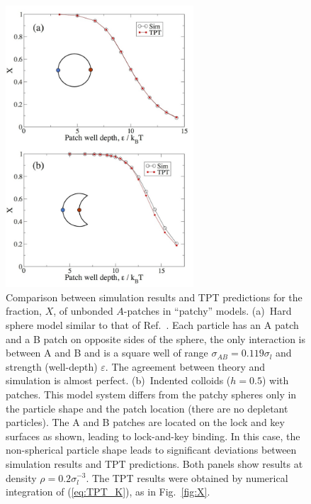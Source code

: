 \documentclass[8.5pt,oneside,onecolumn]{article}
\begin{document}
\begin{figure} 
  \includegraphics[width=7cm]{Fig6.jpg}
  \caption{Comparison between simulation results and TPT predictions for the fraction, $X$, of unbonded $A$-patches in
  ``patchy'' models.  (a)~Hard sphere 
  model similar to that of Ref.~\cite{Sciortino2007}. 
  Each particle has an A patch and a B patch on opposite sides of the sphere, 
  the only interaction is between A and B and is a square well of range $\sigma_{AB}=0.119\sigma_l$ and strength (well-depth) $\varepsilon$.
  The agreement between theory and simulation is almost perfect.  
  (b)~Indented colloids ($h=0.5$) with patches.  This model system
  differs from the patchy spheres only in the particle shape and the patch location (there are no depletant particles).
  The A and B patches are located on the lock and key surfaces as shown, leading to lock-and-key binding.
  In this case, the non-spherical particle shape leads to significant deviations between simulation results and TPT predictions.
  Both panels show results at density $\rho=0.2\sigma_l^{-3}$.  
  The TPT results were obtained by numerical integration of (\ref{eq:TPT_K}),
  as in Fig.~\ref{fig:X}.
  }
  \label{fig:patchyspheres}
\end{figure}
\end{document}
